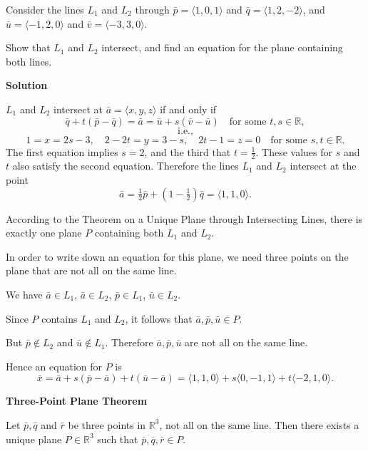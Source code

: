 \begin{examplebox}
  Consider the lines \(L_1\) and \(L_2\) through \(\bar{p} = \langle 1,0,1 \rangle\) and \(\bar{q} = \langle 1,2,-2 \rangle\),
  and \(\bar{u} = \langle -1,2,0 \rangle\) and \(\bar{v} = \langle -3,3,0 \rangle\).

  Show that \(L_1\) and \(L_2\) intersect, and find an equation for the plane containing both lines.

  \vspace{0.5em}

  \textbf{Solution}

  \vspace{0.5em}

  \(L_1\) and \(L_2\) intersect at \(\bar{a} = \langle x, y, z \rangle\) if and only if
  \[
    \bar{q} + t(\bar{p} - \bar{q}) = \bar{a} = \bar{u} + s(\bar{v} - \bar{u})
    \quad \text{for some } t, s \in \mathbb{R},
  \]
  \[
    \text{i.e.,}
  \]
  \[
    1 = x = 2s - 3,\quad
    2 - 2t = y = 3 - s,\quad
    2t - 1 = z = 0
    \quad \text{for some } s, t \in \mathbb{R}.
  \]
  The first equation implies \(s = 2\), and the third that \(t = \tfrac{1}{2}\).
  These values for \(s\) and \(t\) also satisfy the second equation.
  Therefore the lines \(L_1\) and \(L_2\) intersect at the point
  \[
    \bar{a} = \tfrac{1}{2} \bar{p} + \left( 1 - \tfrac{1}{2} \right) \bar{q}
    = \langle 1, 1, 0 \rangle.
  \]

  According to the Theorem on a Unique Plane through Intersecting Lines, there is exactly one plane \(P\) containing both \(L_1\) and \(L_2\).

  In order to write down an equation for this plane, we need three points on the plane that are not all on the same line.

  We have \(\bar{a} \in L_1\), \(\bar{a} \in L_2\), \(\bar{p} \in L_1\), \(\bar{u} \in L_2\).

  Since \(P\) contains \(L_1\) and \(L_2\), it follows that \(\bar{a}, \bar{p}, \bar{u} \in P\).
  
  But \(\bar{p} \notin L_2\) and \(\bar{u} \notin L_1\).
  Therefore \(\bar{a}, \bar{p}, \bar{u}\) are not all on the same line.

  Hence an equation for \(P\) is
  \[
    \bar{x} = \bar{a} + s(\bar{p} - \bar{a}) + t(\bar{u} - \bar{a})
    = \langle 1, 1, 0 \rangle + s\langle 0, -1, 1 \rangle + t\langle -2, 1, 0 \rangle.
  \]
\end{examplebox}


\begin{theorembox}

  \textbf{Three-Point Plane Theorem}

  Let \(\bar{p}, \bar{q}\) and \(\bar{r}\) be three points in \(\mathbb{R}^3\), not all on the same line. 
  Then there exists a unique plane \(P \in \mathbb{R}^3\) such that \(\bar{p}, \bar{q}, \bar{r} \in P\).
\end{theorembox}

